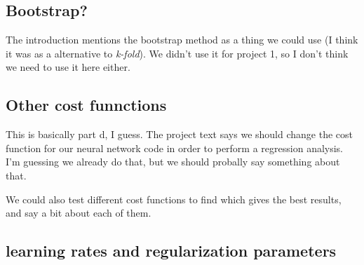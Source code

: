 \documentclass[a4paper,10pt,english]{article}
\begin{document}
\begin{multicols*}{2}
%
%


\subsection*{Bootstrap?}

The introduction mentions the bootstrap method as a thing we could use (I think it was as a alternative to \textit{k-fold}). We didn't use it for project 1, so I don't think we need to use it here either.


\subsection*{Other cost funnctions}

This is basically part d, I guess. The project text says we should change the cost function for our neural network code in order to perform a regression analysis. I'm guessing we already do that, but we should probally say something about that. 

We could also test different cost functions to find which gives the best results, and say a bit about each of them. 


\subsection*{learning rates and regularization parameters}


\end{multicols*}
\end{document}
